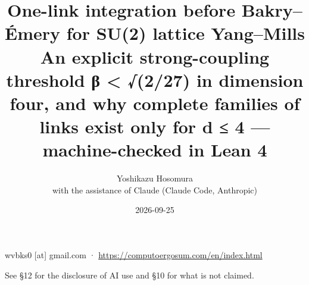 \documentclass[11pt,a4paper]{article}
\theoremstyle{named}
\begin{document}
\title{One-link integration before Bakry–Émery for SU(2) lattice Yang–Mills\\[.5em]\large An explicit strong-coupling threshold β \textless{} √(2/27) in dimension four, and why complete families of links exist only for d ≤ 4 — machine-checked in Lean 4}
\author{Yoshikazu Hosomura\\[.3em]\normalsize with the assistance of Claude (Claude Code, Anthropic)}
\date{2026-09-25}
\maketitle
\begin{center}\small wvbks0 [at] gmail.com · \url{https://computoergosum.com/en/index.html}\end{center}
\begin{center}\small See §12 for the disclosure of AI use and §10 for what is not claimed.\end{center}
\end{document}
